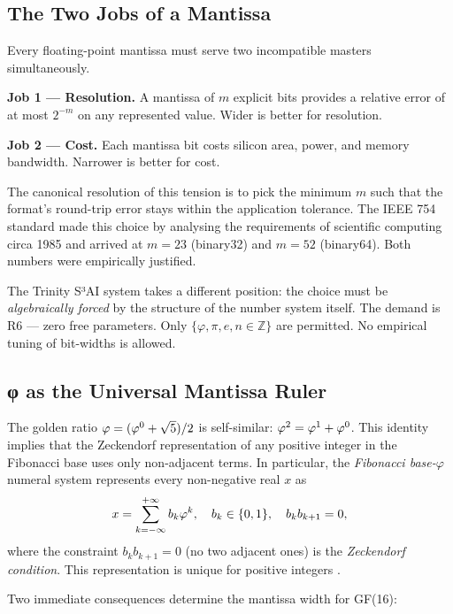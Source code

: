 \subsection{The Two Jobs of a Mantissa}
\label{ssec:two-jobs}

Every floating-point mantissa must serve two incompatible masters
simultaneously.

\textbf{Job 1 — Resolution.}  A mantissa of \(m\) explicit bits
provides a relative error of at most \(2^{-m}\) on any represented
value.  Wider is better for resolution.

\textbf{Job 2 — Cost.}  Each mantissa bit costs silicon area, power,
and memory bandwidth.  Narrower is better for cost.

The canonical resolution of this tension is to pick the minimum \(m\)
such that the format's round-trip error stays within the application
tolerance.  The IEEE 754 standard \cite{ieee754_2019} made this choice
by analysing the requirements of scientific computing circa 1985 and
arrived at \(m = 23\) (binary32) and \(m = 52\) (binary64).  Both
numbers were empirically justified.

The Trinity S³AI system takes a different position: the choice must be
\emph{algebraically forced} by the structure of the number system
itself.  The demand is R6 — zero free parameters.  Only \(\{\varphi,
\pi, e, n \in \mathbb{Z}\}\) are permitted.  No empirical tuning of
bit-widths is allowed.

\subsection{φ as the Universal Mantissa Ruler}
\label{ssec:phi-as-ruler}

The golden ratio \(\varphi = (\varphi^{0} + \sqrt{5})/2\) is
self-similar: \(\varphi^{2} = \varphi^{1} + \varphi^{0}\).  This
identity implies that the Zeckendorf representation of any positive
integer in the Fibonacci base uses only non-adjacent terms.  In
particular, the \emph{Fibonacci base-\(\varphi\)} numeral system
represents every non-negative real \(x\) as
\[
  x = \sum_{k=-\infty}^{+\infty} b_k \varphi^{k}, \quad b_k \in \{0,1\}, \quad b_k b_{k+1} = 0,
\]
where the constraint \(b_k b_{k+1} = 0\) (no two adjacent ones) is
the \emph{Zeckendorf condition}.  This representation is unique for
positive integers \cite{koshy_fib_lucas}.

Two immediate consequences determine the mantissa width for GF(16):


